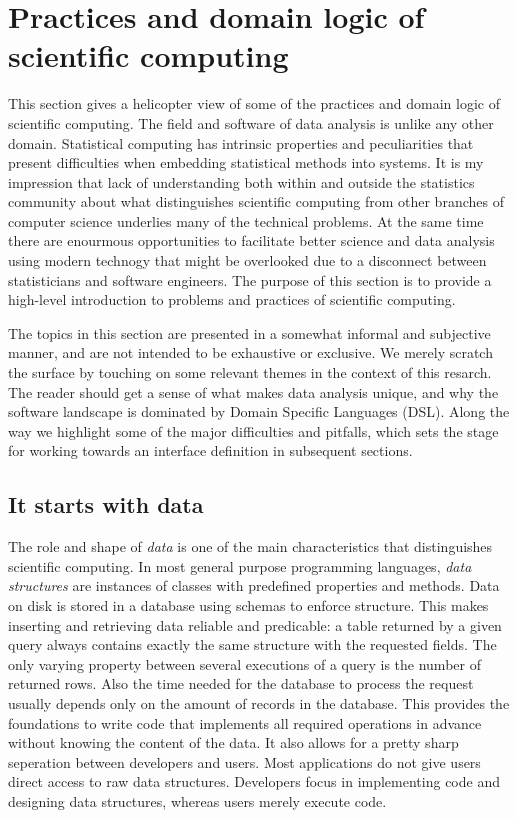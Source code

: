 \section{Practices and domain logic of scientific computing}

This section gives a helicopter view of some of the practices and domain logic of scientific computing. The field and software of data analysis is unlike any other domain. Statistical computing has intrinsic properties and peculiarities that present difficulties when embedding statistical methods into systems. It is my impression that lack of understanding both within and outside the statistics community about what distinguishes scientific computing from other branches of computer science underlies many of the technical problems. At the same time there are enourmous opportunities to facilitate better science and data analysis using modern technogy that might be overlooked due to a disconnect between statisticians and software engineers. The purpose of this section is to provide a high-level introduction to problems and practices of scientific computing.

The topics in this section are presented in a somewhat informal and subjective manner, and are not intended to be exhaustive or exclusive. We merely scratch the surface by touching on some relevant themes in the context of this resarch. The reader should get a sense of what makes data analysis unique, and why the software landscape is dominated by Domain Specific Languages (DSL). Along the way we highlight some of the major difficulties and pitfalls, which sets the stage for working towards an interface definition in subsequent sections.

\subsection{It starts with data}

The role and shape of \emph{data} is one of the main characteristics that distinguishes scientific computing. In most general purpose programming languages, \emph{data structures} are instances of classes with predefined properties and methods. Data on disk is stored in a database using schemas to enforce structure. This makes inserting and retrieving data reliable and predicable: a table returned by a given \SQL query always contains exactly the same structure with the requested fields. The only varying property between several executions of a query is the number of returned rows. Also the time needed for the database to process the request usually depends only on the amount of records in the database. This provides the foundations to write code that implements all required operations in advance without knowing the content of the data. It also allows for a pretty sharp seperation between developers and users. Most applications do not give users direct access to raw data structures. Developers focus in implementing code and designing data structures, whereas users merely execute code.


